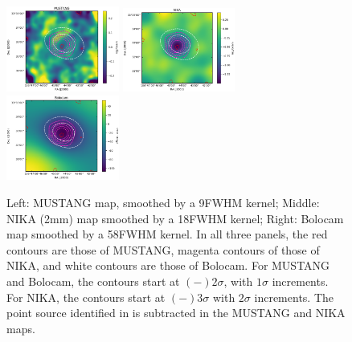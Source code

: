 \documentclass[onecolumn,traditabstract]{aa}
\begin{document}
\begin{figure}[!h]
  \centering
  \includegraphics[width=0.33\textwidth]{NIKA_ml_deproj_figs/MUSTANG_image_and_SNR_contours_cbar.eps}
  \includegraphics[width=0.33\textwidth]{NIKA_ml_deproj_figs/NIKA_image_and_SNR_contours_cbar.eps}
  \includegraphics[width=0.33\textwidth]{NIKA_ml_deproj_figs/BOLOCAM_image_and_SNR_contours_cbar.eps}
  \caption{Left: MUSTANG map, smoothed by a 9\asecs FWHM kernel; Middle: NIKA (2mm) map smoothed by a 18\asecs FWHM kernel;
    Right: Bolocam map smoothed by a 58\asecs FWHM kernel. In all three panels, the red contours are those
    of MUSTANG, magenta contours of those of NIKA, and white contours are those of Bolocam. For MUSTANG and Bolocam, the contours
    start at $(-)2\sigma$, with $1\sigma$ increments. For NIKA, the contours start at $(-)3\sigma$ with $2\sigma$ increments.
    The point source identified in \citet{adam2015} is subtracted in the MUSTANG
    and NIKA maps.}
  \label{fig:clj1227_maps}
\end{figure}
\end{document}
